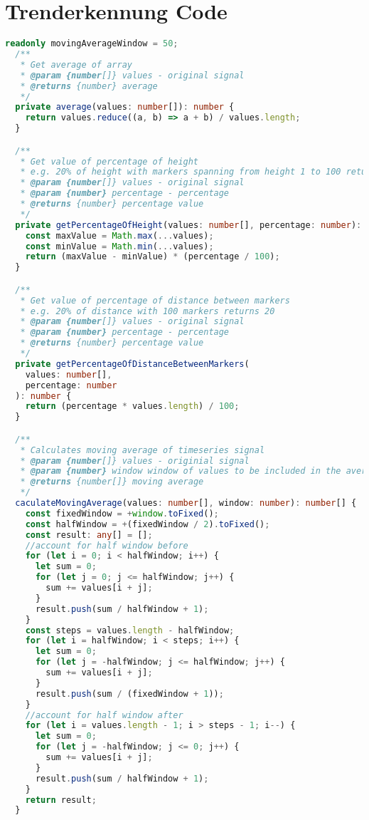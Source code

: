 \chapter{Trenderkennung Code}
\label{appendix:trend-detection-code}
\begin{lstlisting}[language=Typescript]
  readonly movingAverageWindow = 50;
  /**
   * Get average of array
   * @param {number[]} values - original signal
   * @returns {number} average
   */
  private average(values: number[]): number {
    return values.reduce((a, b) => a + b) / values.length;
  }

  /**
   * Get value of percentage of height
   * e.g. 20% of height with markers spanning from height 1 to 100 returns 20
   * @param {number[]} values - original signal
   * @param {number} percentage - percentage
   * @returns {number} percentage value
   */
  private getPercentageOfHeight(values: number[], percentage: number): number {
    const maxValue = Math.max(...values);
    const minValue = Math.min(...values);
    return (maxValue - minValue) * (percentage / 100);
  }

  /**
   * Get value of percentage of distance between markers
   * e.g. 20% of distance with 100 markers returns 20
   * @param {number[]} values - original signal
   * @param {number} percentage - percentage
   * @returns {number} percentage value
   */
  private getPercentageOfDistanceBetweenMarkers(
    values: number[],
    percentage: number
  ): number {
    return (percentage * values.length) / 100;
  }

  /**
   * Calculates moving average of timeseries signal
   * @param {number[]} values - originial signal
   * @param {number} window window of values to be included in the average
   * @returns {number[]} moving average
   */
  caculateMovingAverage(values: number[], window: number): number[] {
    const fixedWindow = +window.toFixed();
    const halfWindow = +(fixedWindow / 2).toFixed();
    const result: any[] = [];
    //account for half window before
    for (let i = 0; i < halfWindow; i++) {
      let sum = 0;
      for (let j = 0; j <= halfWindow; j++) {
        sum += values[i + j];
      }
      result.push(sum / halfWindow + 1);
    }
    const steps = values.length - halfWindow;
    for (let i = halfWindow; i < steps; i++) {
      let sum = 0;
      for (let j = -halfWindow; j <= halfWindow; j++) {
        sum += values[i + j];
      }
      result.push(sum / (fixedWindow + 1));
    }
    //account for half window after
    for (let i = values.length - 1; i > steps - 1; i--) {
      let sum = 0;
      for (let j = -halfWindow; j <= 0; j++) {
        sum += values[i + j];
      }
      result.push(sum / halfWindow + 1);
    }
    return result;
  }


\end{lstlisting}
